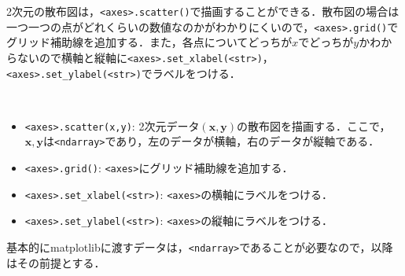 2次元の散布図は，\texttt{<axes>.scatter()}で描画することができる．散布図の場合は一つ一つの点がどれくらいの数値なのかがわかりにくいので，\texttt{<axes>.grid()}でグリッド補助線を追加する．また，各点についてどっちが$x$でどっちが$y$かわからないので横軸と縦軸に\texttt{<axes>.set\_xlabel(<str>)}，\texttt{<axes>.set\_ylabel(<str>)}でラベルをつける．
\begin{gram}　
\begin{itemize}
\item \texttt{<axes>.scatter(x,y)}: 2次元データ$(\bm{x},\bm{y})$の散布図を描画する．ここで，$\bm{x},\bm{y}$は\texttt{<ndarray>}であり，左のデータが横軸，右のデータが縦軸である．
\item \texttt{<axes>.grid()}: \texttt{<axes>}にグリッド補助線を追加する．
\item \texttt{<axes>.set\_xlabel(<str>)}: \texttt{<axes>}の横軸にラベルをつける．
\item \texttt{<axes>.set\_ylabel(<str>)}: \texttt{<axes>}の縦軸にラベルをつける．
\end{itemize}
\end{gram}


\begin{rem}
基本的にmatplotlibに渡すデータは，\texttt{<ndarray>}であることが必要なので，以降はその前提とする．
\end{rem}

\begin{cod}[\texttt{fig2.py}]　
}]{code/fig2.py}
\vspace{-19pt}
\begin{figure}[H]
\begin{center}
\framed
\texttt{[image: code/fig2.eps]}
\vspace{-10pt}
\caption{\texttt{fig2.eps}}
\endframed
\end{center}
\end{figure}
\end{cod}
\vspace{-20pt}